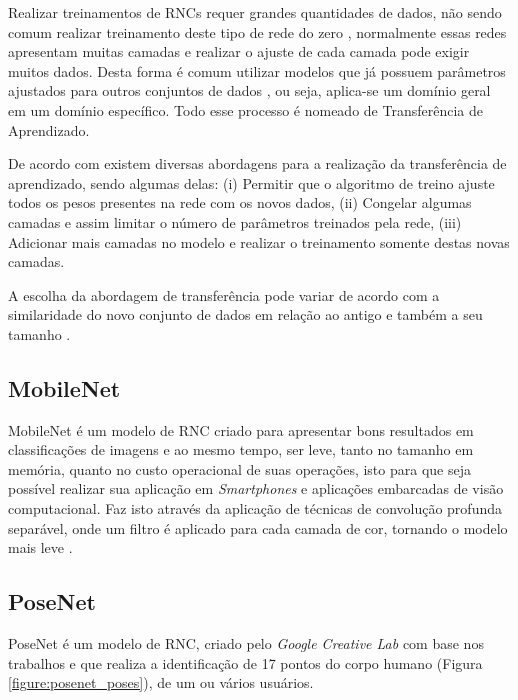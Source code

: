 \par Realizar treinamentos de RNCs requer grandes quantidades de dados, não sendo comum realizar treinamento deste tipo de rede do zero \cite{Carneiro2017}, normalmente essas redes apresentam muitas camadas e realizar o ajuste de cada camada pode exigir muitos dados. Desta forma é comum utilizar modelos que já possuem parâmetros ajustados para outros conjuntos de dados \cite{Ponti2018}, ou seja, aplica-se um domínio geral em um domínio específico. Todo esse processo é nomeado de Transferência de Aprendizado.

\par De acordo com  existem diversas abordagens para a realização da transferência de aprendizado, sendo algumas delas: (i) Permitir que o algoritmo de treino ajuste todos os pesos presentes na rede com os novos dados, (ii) Congelar algumas camadas e assim limitar o número de parâmetros treinados pela rede, (iii) Adicionar mais camadas no modelo e realizar o treinamento somente destas novas camadas.

\par A escolha da abordagem de transferência pode variar de acordo com a similaridade do novo conjunto de dados em relação ao antigo e também a seu tamanho \cite{Carneiro2017}.

\subsection{MobileNet}

\par MobileNet é um modelo de RNC criado para apresentar bons resultados em classificações de imagens e ao mesmo tempo, ser leve, tanto no tamanho em memória, quanto no custo operacional de suas operações, isto para que seja possível realizar sua aplicação em \textit{Smartphones} e aplicações embarcadas de visão computacional. Faz isto através da aplicação de técnicas de convolução profunda separável, onde um filtro é aplicado para cada camada de cor, tornando o modelo mais leve \cite{howard2017mobilenets}.

\subsection{PoseNet}

\par PoseNet é um modelo de RNC, criado pelo \textit{Google Creative Lab} com base nos trabalhos  e  que realiza a identificação de 17 pontos do corpo humano (Figura \ref{figure:posenet_poses}), de um ou vários usuários.

